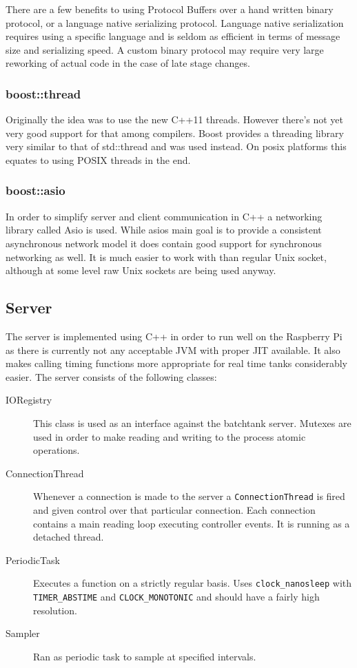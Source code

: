 \documentclass{article}
\begin{document}
There are a few benefits to using Protocol Buffers over a hand written
binary protocol, or a language native serializing protocol. Language
native serialization requires using a specific language and is seldom as
efficient in terms of message size and serializing speed. A custom
binary protocol may require very large reworking of actual code in the
case of late stage changes.


\subsubsection{boost::thread~\cite{boost::thread}}
Originally the idea was to use the new C++11 threads. However there's
not yet very good support for that among compilers. Boost provides a
threading library very similar to that of std::thread and was used
instead. On posix platforms this equates to using POSIX threads in the
end.


\subsubsection{boost::asio~\cite{boost::asio}}
In order to simplify server and client communication in C++ a networking
library called Asio is used. While asios main goal is to provide a
consistent asynchronous network model it does contain good support for
synchronous networking as well. It is much easier to work with than
regular Unix socket, although at some level raw Unix sockets are being
used anyway.


\subsection{Server}
The server is implemented using C++ in order to run well on the Raspberry Pi as
there is currently not any acceptable JVM with proper JIT available. It
also makes calling timing functions more appropriate for real time tanks
considerably easier. The server consists of the following classes:

\begin{description}
\item[IORegistry]
  This class is used as an interface against the batchtank server.
  Mutexes are used in order to make reading and writing to the process
  atomic operations.

\item[ConnectionThread]
  Whenever a connection is made to the server a \verb+ConnectionThread+
  is fired and given control over that particular connection. Each
  connection contains a main reading loop executing controller events.
  It is running as a detached thread.

\item[PeriodicTask]
  Executes a function on a strictly regular basis. Uses
  \verb+clock_nanosleep+  with \verb+TIMER_ABSTIME+ and
  \verb+CLOCK_MONOTONIC+ and should have a fairly high resolution.

\item[Sampler]
  Ran as periodic task to sample at specified intervals.
\end{description}
\end{document}
